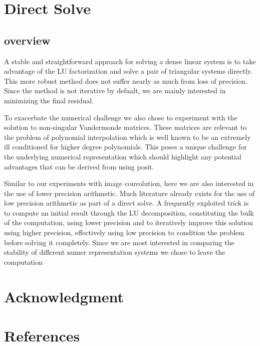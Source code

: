 \documentclass[conference]{IEEEtran}
\begin{document}
\section{Direct Solve}

\subsection{overview}
A stable and straightforward approach for solving a dense linear system is to take advantage of the LU factorization and solve a pair of triangular systems directly. This more robust method does not suffer nearly as much from loss of precision. Since the method is not iterative by defualt, we are mainly interested in minimizing the final residual. 

To exacerbate the numerical challenge we also chose to experiment with the solution to non-singular Vandermonde matrices. These matrices are relevant to the problem of polynomial interpolation which is well known to be an extremely ill conditioned for higher degree polynomials. This poses a unique challenge for the underlying numerical representation which should highlight any potential advantages that can be derived from using posit. 

Similar to our experiments with image convolution, here we are also interested in the use of lower precision arithmetic. Much literature already exists for the use of low precision arithmetic as part of a direct solve. A frequently exploited trick is to compute an initial result through the LU decomposition, constituting the bulk of the computation, using lower precision and to iteratively improve this solution using higher precision, effectively using low precision to condition the problem before solving it completely. Since we are most interested in comparing the stability of different numer representation systems we chose to leave the computation 

\section*{Acknowledgment}


\section*{References}
\end{document}
